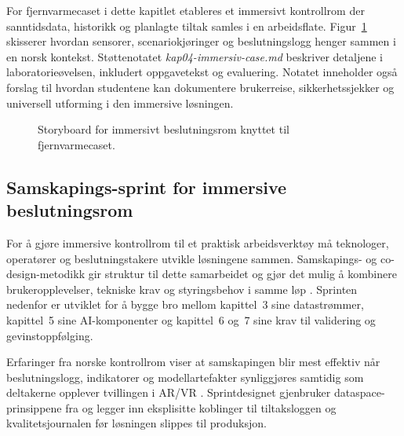 For fjernvarmecaset i dette kapitlet etableres et immersivt kontrollrom der sanntidsdata, historikk og planlagte tiltak samles i en arbeidsflate. Figur~\ref{fig:kap04-immersiv-beslutning} skisserer hvordan sensorer, scenariokjøringer og beslutningslogg henger sammen i en norsk kontekst. Støttenotatet \textit{kap04-immersiv-case.md} beskriver detaljene i laboratorieøvelsen, inkludert oppgavetekst og evaluering. Notatet inneholder også forslag til hvordan studentene kan dokumentere brukerreise, sikkerhetssjekker og universell utforming i den immersive løsningen.

\begin{figure}[htbp]
    \centering
    \caption{Storyboard for immersivt beslutningsrom knyttet til fjernvarmecaset.}
    \label{fig:kap04-immersiv-beslutning}
\end{figure}

\subsection{Samskapings-sprint for immersive beslutningsrom}
For å gjøre immersive kontrollrom til et praktisk arbeidsverktøy må teknologer, operatører og beslutningstakere utvikle løsningene sammen. Samskapings- og co-design-metodikk gir struktur til dette samarbeidet og gjør det mulig å kombinere brukeropplevelser, tekniske krav og styringsbehov i samme løp \citep{doga2022samskaping,sanders2008cocreation}. Sprinten nedenfor er utviklet for å bygge bro mellom kapittel~3 sine datastrømmer, kapittel~5 sine AI-komponenter og kapittel~6 og~7 sine krav til validering og gevinstoppfølging.

Erfaringer fra norske kontrollrom viser at samskapingen blir mest effektiv når beslutningslogg, indikatorer og modellartefakter synliggjøres samtidig som deltakerne opplever tvillingen i AR/VR \citep{kongsberg2023kognitwin,statnett2024kontrolltarn}. Sprintdesignet gjenbruker dataspace-prinsippene fra \citet{digitalnorway2024dataspace} og legger inn eksplisitte koblinger til tiltaksloggen og kvalitetsjournalen før løsningen slippes til produksjon.

